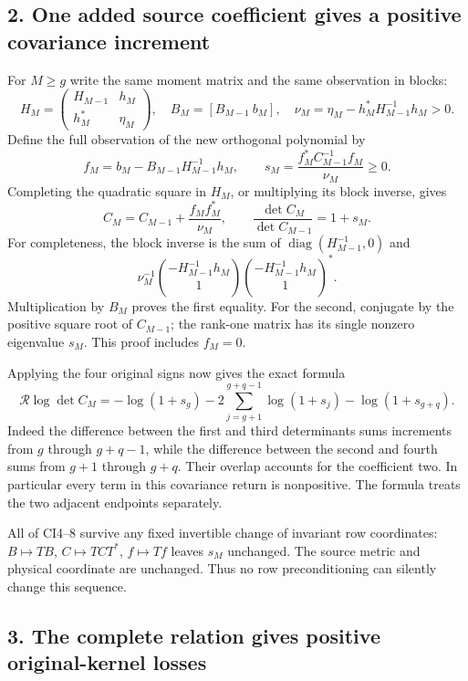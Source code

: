\documentclass[11pt]{article}
\begin{document}
\subsection{2. One added source coefficient gives a positive covariance increment}\label{one-added-source-coefficient-gives-a-positive-covariance-increment}

For \(M\ge g\) write the same moment matrix and the same observation in blocks: \[
H_M=\begin{pmatrix}H_{M-1}&h_M\\h_M^*&\eta_M\end{pmatrix},
\quad B_M=[B_{M-1}\ b_M],\quad
\nu_M=\eta_M-h_M^*H_{M-1}^{-1}h_M>0.
\tag{CI5}
\] Define the full observation of the new orthogonal polynomial by \[
f_M=b_M-B_{M-1}H_{M-1}^{-1}h_M,\qquad
s_M=\frac{f_M^*C_{M-1}^{-1}f_M}{\nu_M}\ge0.
\tag{CI6}
\] Completing the quadratic square in \(H_M\), or multiplying its block inverse, gives \[
C_M=C_{M-1}+\frac{f_Mf_M^*}{\nu_M},\qquad
\frac{\det C_M}{\det C_{M-1}}=1+s_M.
\tag{CI7}
\] For completeness, the block inverse is the sum of \(\operatorname{diag}(H_{M-1}^{-1},0)\) and\[\nu_M^{-1}\binom{-H_{M-1}^{-1}h_M}{1}\binom{-H_{M-1}^{-1}h_M}{1}^{*}.\] Multiplication by \(B_M\) proves the first equality. For the second, conjugate by the positive square root of \(C_{M-1}\); the rank-one matrix has its single nonzero eigenvalue \(s_M\). This proof includes \(f_M=0\).

Applying the four original signs now gives the exact formula \[
\boxed{\mathcal R\log\det C_M
=-\log(1+s_g)-2\sum_{j=g+1}^{g+q-1}\log(1+s_j)
-\log(1+s_{g+q}).}
\tag{CI8}
\] Indeed the difference between the first and third determinants sums increments from \(g\) through \(g+q-1\), while the difference between the second and fourth sums from \(g+1\) through \(g+q\). Their overlap accounts for the coefficient two. In particular every term in this covariance return is nonpositive. The formula treats the two adjacent endpoints separately.

All of CI4--8 survive any fixed invertible change of invariant row coordinates: \(B\mapsto TB\), \(C\mapsto TCT^*\), \(f\mapsto Tf\) leaves \(s_M\) unchanged. The source metric and physical coordinate are unchanged. Thus no row preconditioning can silently change this sequence.

\subsection{3. The complete relation gives positive original-kernel losses}\label{the-complete-relation-gives-positive-original-kernel-losses}
\end{document}
